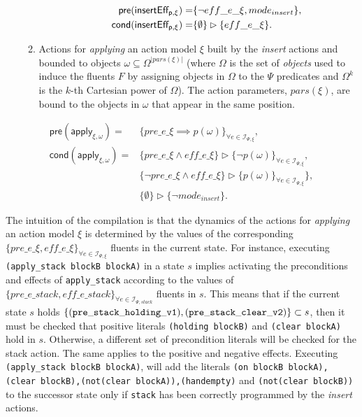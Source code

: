 \documentclass{article}
\newcommand{\pre}{\mathsf{pre}}     %
\newcommand{\cond}{\mathsf{cond}}   %
\begin{document}
\begin{itemize}
\begin{enumerate}
\begin{itemize}
\begin{small}
\begin{align*}
\hspace*{7pt}\pre(\mathsf{insertEff_{p,\xi}})=&\{\neg eff\_e\_\xi, mode_{insert}\},\\
\cond(\mathsf{insertEff_{p,\xi}})=&\{\emptyset\}\rhd\{eff\_e\_\xi\}.
\end{align*}
\end{small}
\end{itemize}

\item Actions for {\em applying} an action model $\xi$ built by the {\em insert} actions and bounded to objects $\omega\subseteq\Omega^{|pars(\xi)|}$ (where $\Omega$ is the set of {\em objects} used to induce the fluents $F$ by assigning objects in $\Omega$ to the $\Psi$ predicates and $\Omega^k$ is the $k$-th Cartesian power of $\Omega$). The action parameters, $pars(\xi)$, are bound to the objects in $\omega$ that appear in the same position.
\end{enumerate}
\end{itemize}

\begin{small}
\begin{align*}
\pre(\mathsf{apply_{\xi,\omega}})=&\{pre\_e\_\xi\implies p(\omega)\}_{\forall e\in{\mathcal I}_{\Psi,\xi}},\\
\cond(\mathsf{apply_{\xi,\omega}})=&\{pre\_e\_\xi\wedge eff\_e\_\xi\}\rhd\{\neg p(\omega)\}_{\forall e\in{\mathcal I}_{\Psi,\xi}},\\
&\{\neg pre\_e\_\xi \wedge eff\_e\_\xi\}\rhd\{p(\omega)\}_{\forall e\in{\mathcal I}_{\Psi,\xi}}\},\\
&\{\emptyset\}\rhd\{\neg mode_{insert}\}.
\end{align*}
\end{small}

The intuition of the compilation is that the dynamics of the actions for {\em applying} an action model $\xi$ is determined by the values of the corresponding $\{pre\_e\_\xi, eff\_e\_\xi\}_{\forall e\in{\mathcal I}_{\Psi,\xi}}$ fluents in the current state. For instance, executing {\tt{\small (apply\_stack blockB blockA)}} in a state $s$ implies activating the preconditions and effects of {\tt{\small apply\_stack}} according to the values of $\{pre\_e\_stack, eff\_e\_stack\}_{\forall e\in{\mathcal I}_{\Psi,stack}}$ fluents in $s$. This means that if the current state $s$ holds $\{{\tt\scriptsize (pre\_stack\_holding\_v1),(pre\_stack\_clear\_v2)}\} \subset s$, then it must be checked that positive literals {\tt{\small (holding blockB)}} and {\tt{\small (clear blockA)}} hold in $s$. Otherwise, a different set of precondition literals will be checked for the stack action. The same applies to the positive and negative effects. Executing {\tt{\small (apply\_stack blockB blockA)}}, will add the literals {\tt{\small (on blockB blockA),(clear blockB),(not(clear blockA)),(handempty)}} and {\tt{\small(not(clear blockB))}} to the successor state only if {\tt{\small stack}} has been correctly programmed by the {\em insert} actions.
\end{document}
